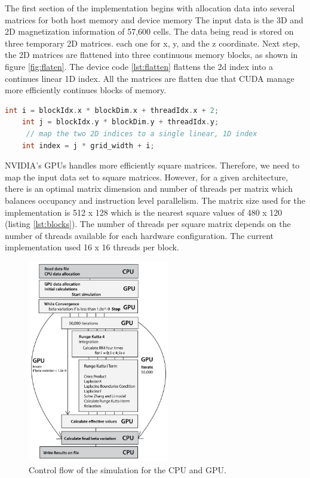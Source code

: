 The first section of the implementation begins with allocation data into several matrices for both host memory and device memory The input data is the 3D and 2D magnetization information of 57,600 cells. The data being read is stored on three temporary 2D matrices. each one for x, y, and the z coordinate. Next step, the 2D matrices are flattened into three continuous memory blocks, as shown in figure \ref{fig:flaten}. The device code \ref{lst:flatten} flattens the 2d index into a continues linear 1D index. All the matrices are flatten due that CUDA manage more efficiently continues blocks of memory.

\begin{lstlisting}[language=C++, label={lst:flatten}, caption={Kernel flatten 2d - 1d}]	
    int i = blockIdx.x * blockDim.x + threadIdx.x + 2;
    int j = blockIdx.y * blockDim.y + threadIdx.y;
     // map the two 2D indices to a single linear, 1D index
    int index = j * grid_width + i; 
\end{lstlisting}


NVIDIA's GPUs handles more efficiently square matrices. Therefore, we need to map the input data set to square matrices. However, for a given architecture, there is an optimal matrix dimension and number of threads per matrix which balances occupancy and instruction level parallelism.  The matrix size used for the implementation is 512 x 128 which is the nearest square values of 480 x 120 (listing  \ref{lst:blocks}). The number of threads per square matrix depends on the number of threads available for each hardware configuration. The current implementation used 16 x 16 threads per block.
 
\begin{figure}[htbp]
	\centering
		\includegraphics[width=0.55\textwidth]{Figures/flow.png}
		\smallskip
	\caption[Control flow]{Control flow of the simulation for the CPU and GPU.}
	\label{fig:flow}
\end{figure}


